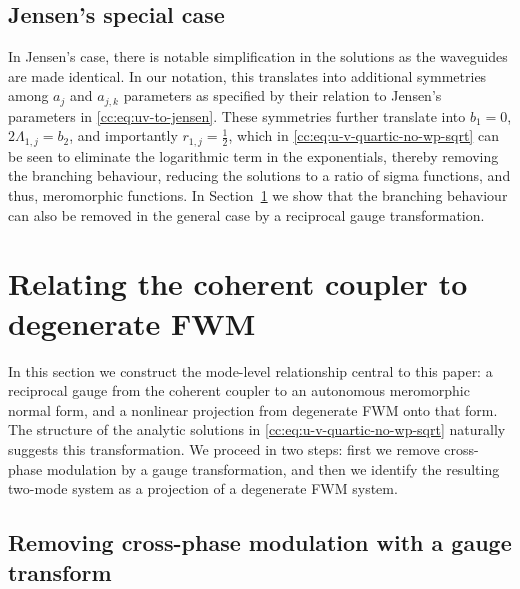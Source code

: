\documentclass[11pt,a4paper]{article}
\numberwithin{equation}{section}
\begin{document}
\subsection{Jensen's special case}

In Jensen's case, there is notable simplification in the solutions as the waveguides are made identical.
In our notation, this translates into additional symmetries among $a_j$ and $a_{j,k}$ parameters as specified by their relation to Jensen's parameters in \eqref{cc:eq:uv-to-jensen}.
These symmetries further translate into $b_1=0$, $2\Lambda_{1,j}=b_2$, and importantly $r_{1,j} = \frac{1}{2}$, which in \eqref{cc:eq:u-v-quartic-no-wp-sqrt} can be seen to eliminate the logarithmic term in the exponentials, thereby removing the branching behaviour, reducing the solutions to a ratio of sigma functions, and thus, meromorphic functions.
In Section~\ref{cc:sec:coord-transforms} we show that the branching behaviour can also be removed in the general case by a reciprocal gauge transformation.


\section{Relating the coherent coupler to degenerate FWM} \label{cc:sec:coord-transforms}

In this section we construct the mode-level relationship central to this paper: a reciprocal gauge from the coherent coupler to an autonomous meromorphic normal form, and a nonlinear projection from degenerate FWM onto that form.
The structure of the analytic solutions in \eqref{cc:eq:u-v-quartic-no-wp-sqrt} naturally suggests this transformation.
We proceed in two steps: first we remove cross-phase modulation by a gauge transformation, and then we identify the resulting two-mode system as a projection of a degenerate FWM system.

\subsection{Removing cross-phase modulation with a gauge transform}
\end{document}

